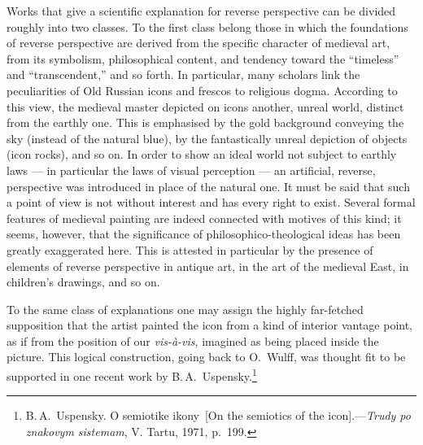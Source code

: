 Works that give a scientific explanation for reverse perspective can be divided
roughly into two classes.  To the first class belong those in which the foundations
of reverse perspective are derived from the specific character of medieval art, from
its symbolism, philosophical content, and tendency toward the ``timeless'' and
``transcendent,'' and so forth.  In particular, many scholars link the peculiarities
of Old Russian icons and frescos to religious dogma.  According to this view, the
medieval master depicted on icons another, unreal world, distinct from the earthly
one.  This is emphasised by the gold background conveying the sky (instead of the
natural blue), by the fantastically unreal depiction of objects (icon rocks), and so
on.  In order to show an ideal world not subject to earthly laws --- in particular
the laws of visual perception --- an artificial, reverse, perspective was introduced
in place of the natural one.  It must be said that such a point of view is not
without interest and has every right to exist.  Several formal features of medieval
painting are indeed connected with motives of this kind; it seems, however, that the
significance of philosophico-theological ideas has been greatly exaggerated here.
This is attested in particular by the presence of elements of reverse perspective in
antique art, in the art of the medieval East, in children's drawings, and so on.

To the same class of explanations one may assign the highly far-fetched supposition
that the artist painted the icon from a kind of interior vantage point, as if from
the position of our \emph{vis-à-vis}, imagined as being placed inside the picture.
This logical construction, going back to O.~Wulff, was thought fit to be supported
in one recent work by B.\,A.~Uspensky.\footnote{B.\,A.~Uspensky.  O semiotike
  ikony~[On the semiotics of the icon].---\emph{Trudy po znakovym sistemam}, V.
  Tartu, 1971, p.~199.}

